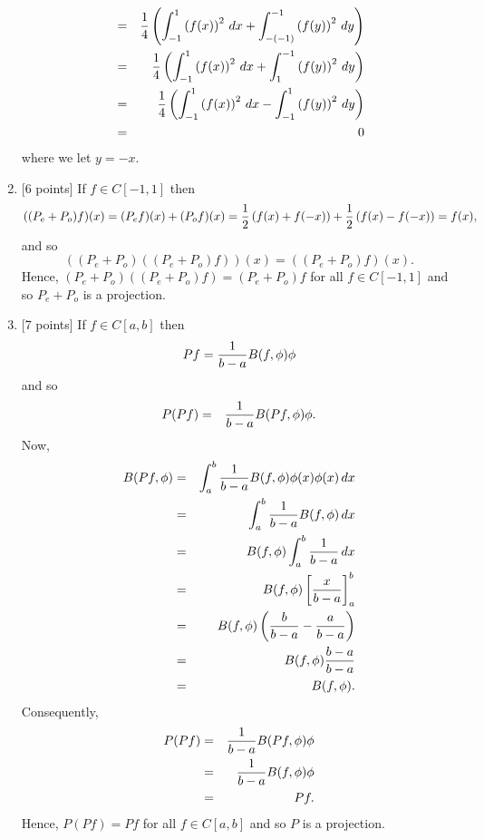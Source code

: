 \begin{solution}
\begin{enumerate}
\begin{eqnarray*}
\\
&=& {1\over 4} \left(\int_{-1}^1 \left(f(x)\right)^2 \, dx + \int_{-(-1)}^{-1} \left(f(y)\right)^2  \, dy\right)
\\
&=& {1\over 4} \left(\int_{-1}^1 \left(f(x)\right)^2 \, dx + \int_1^{-1} \left(f(y)\right)^2  \, dy\right)
\\
&=& {1\over 4} \left(\int_{-1}^1 \left(f(x)\right)^2 \, dx - \int_{-1}^1 \left(f(y)\right)^2  \, dy\right)
\\
&=& 0
\end{eqnarray*}
where we let $y=-x$.
\\
\item {[6 points]} If $f\in C[-1,1]$ then
\[
((P_e+P_o)f)(x)=(P_e f)(x) +(P_o f)(x) = {1 \over 2}\left(f(x) + f(-x)\right)+{1 \over 2}\left(f(x) - f(-x)\right) = f(x),
\]
and so
\[
((P_e+P_o)((P_e+P_o)f))(x)= ((P_e+P_o)f)(x).
\]
Hence, $(P_e+P_o)((P_e+P_o)f)=(P_e+P_o)f$ for all $f\in C[-1,1]$ and so $P_e + P_o$ is a projection.
\\
\item {[7 points]} If $f\in C[a,b]$ then
\[
Pf={1\over b-a}B(f,\phi)\phi
\]
and so
\begin{eqnarray*}
P(Pf)&=&{1\over b-a}B(Pf,\phi)\phi.
\end{eqnarray*}
Now,
\begin{eqnarray*}
B(Pf,\phi)&=&\int_a^b{1\over b-a}B(f,\phi)\phi(x)\phi(x)\,dx
\\
&=&\int_a^b{1\over b-a}B(f,\phi)\,dx
\\
&=&B(f,\phi)\int_a^b{1\over b-a}\,dx
\\
&=&B(f,\phi)\left[{x\over b-a}\right]_a^b
\\
&=&B(f,\phi)\left({b\over b-a}-{a\over b-a}\right)
\\
&=&B(f,\phi){b-a\over b-a}
\\
&=&B(f,\phi).
\end{eqnarray*}
Consequently,
\begin{eqnarray*}
P(Pf)&=&{1\over b-a}B(Pf,\phi)\phi
\\
&=&{1\over b-a}B(f,\phi)\phi
\\
&=&Pf.
\end{eqnarray*}
Hence, $P(Pf)=Pf$ for all $f\in C[a,b]$ and so $P$ is a projection.
\end{enumerate}
\end{solution}